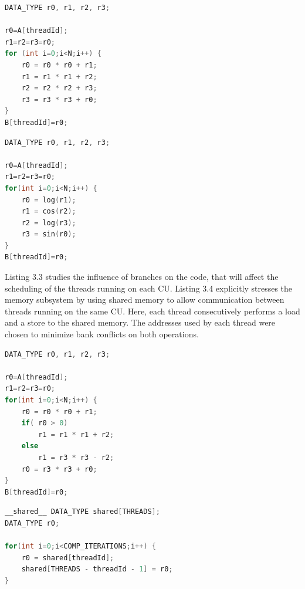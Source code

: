 \noindent\begin{minipage}{.45\textwidth}
\begin{lstlisting}[language=C, caption={Int, SP, DP Code}]
DATA_TYPE r0, r1, r2, r3;

r0=A[threadId]; 
r1=r2=r3=r0; 
for (int i=0;i<N;i++) { 
    r0 = r0 * r0 + r1;  
    r1 = r1 * r1 + r2; 
    r2 = r2 * r2 + r3;  
    r3 = r3 * r3 + r0; 
} 
B[threadId]=r0;
\end{lstlisting}
\end{minipage}\hfill
\begin{minipage}{.45\textwidth}
\begin{lstlisting}[language=C, caption={SF Code}]
DATA_TYPE r0, r1, r2, r3;

r0=A[threadId]; 
r1=r2=r3=r0; 
for(int i=0;i<N;i++) {  
    r0 = log(r1);  
    r1 = cos(r2);  
    r2 = log(r3);  
    r3 = sin(r0);
} 
B[threadId]=r0;
\end{lstlisting}
\end{minipage}

Listing 3.3 studies the influence of branches on the code, that will affect the scheduling of the threads running on each CU. Listing 3.4 explicitly stresses the memory subsystem by using shared memory to allow communication between threads running on the same CU. Here, each thread consecutively performs a load and a store to the shared memory. The addresses used by each thread were chosen to minimize bank conflicts on both operations.


\noindent\begin{minipage}{.4\textwidth}
\begin{lstlisting}[language=C, caption={Branches Code}]
DATA_TYPE r0, r1, r2, r3;

r0=A[threadId]; 
r1=r2=r3=r0; 
for(int i=0;i<N;i++) {  
    r0 = r0 * r0 + r1;  
    if( r0 > 0)
        r1 = r1 * r1 + r2; 
    else 
        r1 = r3 * r3 - r2; 
    r0 = r3 * r3 + r0; 
} 
B[threadId]=r0;
\end{lstlisting}
\end{minipage}\hfill
\begin{minipage}{.55\textwidth}
\begin{lstlisting}[language=C, caption={Shared Memory Code}]
__shared__ DATA_TYPE shared[THREADS]; 
DATA_TYPE r0; 

for(int i=0;i<COMP_ITERATIONS;i++) {  
    r0 = shared[threadId];      
    shared[THREADS - threadId - 1] = r0;
}
\end{lstlisting}
\end{minipage}


